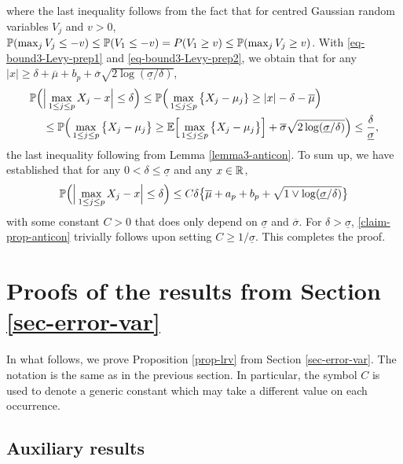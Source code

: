 where the last inequality follows from the fact that for centred Gaussian random variables $V_j$ and $v > 0$, $\mathbb{P}(\max_j V_j \le -v) \le \mathbb{P}(V_1 \le -v) = P(V_1 \ge v) \le \mathbb{P}(\max_j V_j \ge v)$. With \eqref{eq-bound3-Levy-prep1} and \eqref{eq-bound3-Levy-prep2}, we obtain that for any $|x| \ge \delta + \overline{\mu} + b_p + \overline{\sigma}\sqrt{2\log(\underline{\sigma}/\delta)}$,
\begin{align*} 
\mathbb{P} \Big( & \Big| \max_{1 \le j \le p} X_j - x \Big| \le \delta \Big) \le \mathbb{P} \Big( \max_{1 \le j \le p} \big\{ X_j - \mu_j \} \ge |x| - \delta - \overline{\mu} \Big) \\
 & \le \mathbb{P} \Big( \max_{1 \le j \le p} \big\{ X_j - \mu_j \big\} \ge \mathbb{E} \Big[ \max_{1 \le j \le p} \big\{ X_j-\mu_j \big\} \Big] + \overline{\sigma} \sqrt{2\log(\underline{\sigma}/\delta)} \Big) \le \frac{\delta}{\underline{\sigma}}, 
\end{align*}
the last inequality following from Lemma \ref{lemma3-anticon}. To sum up, we have established that for any $0 < \delta \le \underline{\sigma}$ and any $x \in \mathbb{R}$, 
\begin{equation}\label{claim-prop-anticon}
\mathbb{P} \Big( \Big| \max_{1 \le j \le p} X_j - x \Big| \le \delta \Big) \le C \delta \big\{ \overline{\mu} + a_p + b_p + \sqrt{1 \vee \log(\underline{\sigma}/\delta)} \big\} 
\end{equation}
with some constant $C > 0$ that does only depend on $\underline{\sigma}$ and $\overline{\sigma}$. For $\delta > \underline{\sigma}$, \eqref{claim-prop-anticon} trivially follows upon setting $C \ge 1/\underline{\sigma}$. This completes the proof. 



\section{Proofs of the results from Section \ref{sec-error-var}}\label{sec-supp-proofs2}


In what follows, we prove Proposition \ref{prop-lrv} from Section \ref{sec-error-var}. The notation is the same as in the previous section. In particular, the symbol $C$ is used to denote a generic constant which may take a different value on each occurrence. 


\subsection*{Auxiliary results}


